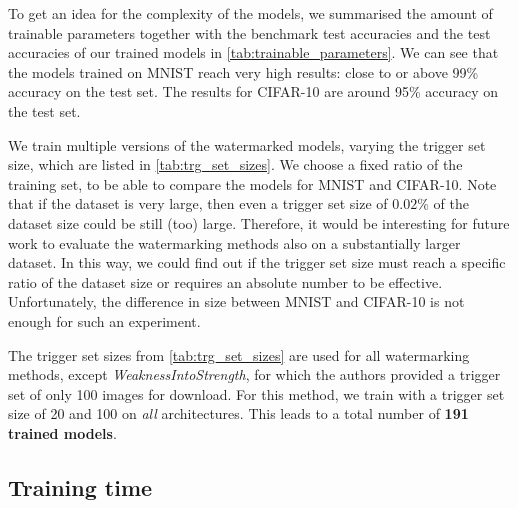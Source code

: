 

To get an idea for the complexity of the models, we summarised the amount of trainable parameters together with the benchmark test accuracies and the test accuracies of our trained models in \cref{tab:trainable_parameters}. We can see that the models trained on MNIST reach very high results: close to or above 99\% accuracy on the test set. The results for CIFAR-10 are around 95\% accuracy on the test set.




We train multiple versions of the watermarked models, varying the trigger set size, which are listed in \cref{tab:trg_set_sizes}. We choose a fixed ratio of the training set, to be able to compare the models for MNIST and CIFAR-10. Note that if the dataset is very large, then even a trigger set size of $0.02\%$ of the dataset size could be still (too) large. Therefore, it would be interesting for future work to evaluate the watermarking methods also on a substantially larger dataset. In this way, we could find out if the trigger set size must reach a specific ratio of the dataset size or requires an absolute number to be effective. Unfortunately, the difference in size between MNIST and CIFAR-10 is not enough for such an experiment.



The trigger set sizes from \cref{tab:trg_set_sizes} are used for all watermarking methods, except \textit{WeaknessIntoStrength}, for which the authors provided a trigger set of only 100 images for download. For this method, we train with a trigger set size of 20 and 100 on \textit{all} architectures.
This leads to a total number of \textbf{191 trained models}.


\subsection{Training time}

